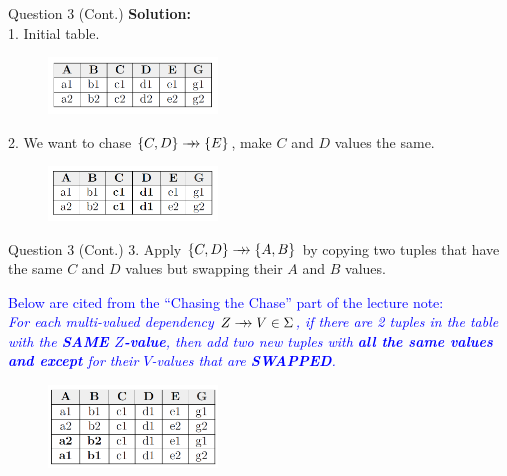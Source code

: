 \begin{frame}[fragile]{Question 3 (Cont.)}	
\textbf{Solution:}\\ \vspace{2pt}
1. Initial table.\\
\begin{figure}
	\includegraphics[width=0.4\textwidth, trim=0 0 0 0, clip]{4221-t5/images/3-1.png}
\end{figure}

2. We want to chase $\{C,D\} \mbox{$\; \rightarrow \! \! \! \! \rightarrow \; $} \{E\}$, make $C$ and $D$ values the same.\\
\begin{figure}
	\includegraphics[width=0.4\textwidth, trim=0 0 0 0, clip]{4221-t5/images/3-2.png}
\end{figure}

\end{frame}

\begin{frame}[fragile]{Question 3 (Cont.)}
3. Apply $\{C,D\} \mbox{$\; \rightarrow \! \! \! \! \rightarrow \; $} \{A,B\}$ by copying two tuples that have the same $C$ and $D$ values but swapping their $A$ and $B$ values.\\\vspace{10pt}

\textcolor{blue}{{\small Below are cited from the ``Chasing the Chase'' part of the lecture note:\\\vspace{5pt}
\textit{For each multi-valued dependency $Z\mbox{$\; \rightarrow \! \! \! \! \rightarrow \; $} V\in\Sigma$, if there are 2 tuples in the table with the \textbf{SAME $Z$-value}, then add two new tuples with \textbf{all the same values and except} for their $V$-values that are \textbf{SWAPPED}.}}}

\begin{figure}
	\includegraphics[width=0.4\textwidth, trim=0 0 0 0, clip]{4221-t5/images/3-3.png}
\end{figure}

\end{frame}


